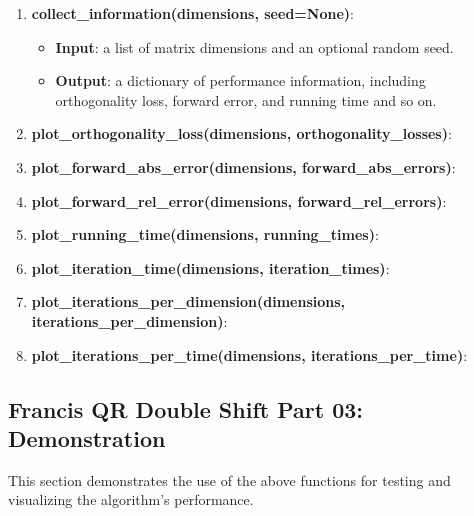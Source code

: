 \documentclass[12pt, a4paper]{ctexart}
\begin{document}
\begin{enumerate}
    \item \textbf{collect\_information(dimensions, seed=None)}:
    \begin{itemize}
        \item \textbf{Input}: a list of matrix dimensions and an optional random seed.
        \item \textbf{Output}: a dictionary of performance information, including orthogonality loss, forward error, and running time and so on.
    \end{itemize}

    \item \textbf{plot\_orthogonality\_loss(dimensions, orthogonality\_losses)}:

    \item \textbf{plot\_forward\_abs\_error(dimensions, forward\_abs\_errors)}:

    \item \textbf{plot\_forward\_rel\_error(dimensions, forward\_rel\_errors)}:
    
    \item \textbf{plot\_running\_time(dimensions, running\_times)}:
    
    \item \textbf{plot\_iteration\_time(dimensions, iteration\_times)}:
    
    \item \textbf{plot\_iterations\_per\_dimension(dimensions, iterations\_per\_dimension)}:
    
    \item \textbf{plot\_iterations\_per\_time(dimensions, iterations\_per\_time)}:
    
\end{enumerate}

\subsection*{Francis QR Double Shift Part 03: Demonstration}
This section demonstrates the use of the above functions for testing and visualizing the algorithm's performance.
\end{document}
